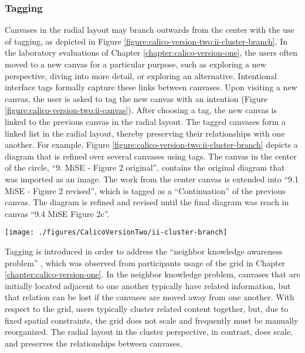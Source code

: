 \documentclass[12pt,fleqn]{ucithesis}
\begin{document}
\subsubsection{Tagging} 

Canvases in the radial layout may branch outwards from the center with the use of tagging, as depicted in Figure \ref{figure:calico-version-two:ii-cluster-branch}. In the laboratory evaluations of Chapter \ref{chapter:calico-version-one}, the users often moved to a new canvas for a particular purpose, such as exploring a new perspective, diving into more detail, or exploring an alternative. Intentional interface tags formally capture these links between canvases. Upon visiting a new canvas, the user is asked to tag the new canvas with an intention (Figure \ref{figure:calico-version-two:ii-canvas}). After choosing a tag, the new canvas is linked to the previous canvas in the radial layout. The tagged canvases form a linked list in the radial layout, thereby preserving their relationships with one another. For example, Figure \ref{figure:calico-version-two:ii-cluster-branch} depicts a diagram that is refined over several canvases using tags. The canvas in the center of the circle, ``9. MiSE - Figure 2 original'', contains the original diagram that was imported as an image. The work from the center canvas is extended into ``9.1 MiSE - Figure 2 revised'', which is tagged as a ``Continuation'' of the previous canvas. The diagram is refined and revised until the final diagram was reach in canvas ``9.4 MiSE Figure 2c''.

\begin{figure*}[tbh]
  \centering
  \texttt{[image: ./figures/CalicoVersionTwo/ii-cluster-branch]}
  \caption{A diagram is refined and revised across several canvases, which are linked with ``Continuation'' and ``Alternative'' tags.}
  \label{figure:calico-version-two:ii-cluster-branch}
\end{figure*}


Tagging is introduced in order to address the ``neighbor knowledge awareness problem'' \cite{dekel2007notation}, which was observed from participants usage of the grid in Chapter \ref{chapter:calico-version-one}. In the neighbor knowledge problem, canvases that are initially located adjacent to one another typically have related information, but that relation can be lost if the canvases are moved away from one another. With respect to the grid, users typically cluster related content together, but, due to fixed spatial constraints, the grid does not scale and frequently must be manually reorganized. The radial layout in the cluster perspective, in contrast, does scale, and preserves the relationships between canvases. 
\end{document}
